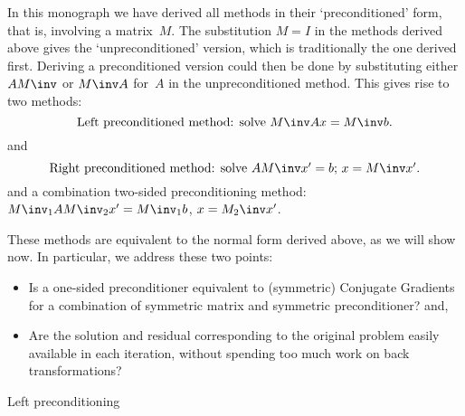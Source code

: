 \documentclass[11pt]{artikel3}
\begin{document}
\begin{Outline}
In this monograph we have derived all methods in their
`preconditioned' form, that is, involving a matrix~$M$.
The substitution $M=I$ in the methods derived above gives the 
`unpreconditioned' version, which is traditionally the one derived
first. Deriving a preconditioned version could then be done
by substituting either $AM\inv$ or $M\inv A$ for~$A$ in the unpreconditioned
method. This gives rise to two methods:
\begin{equation}
 \hbox{Left preconditioned method: solve $M\inv Ax=M\inv b$.}\end{equation}
and 
\begin{equation}
 \hbox{Right preconditioned method: solve $AM\inv x'=b$; $x=M\inv x'$.}\end{equation}
and a combination two-sided preconditioning method:
$M\inv_1AM\inv_2x'=M\inv_1b$, $x=M_2\inv x'$.

These methods are equivalent to the normal form derived above,
as we will show now. In particular, we address these two points:
\begin{itemize}
\item Is a one-sided preconditioner equivalent to (symmetric) Conjugate
Gradients for a combination of symmetric matrix and symmetric preconditioner?
and,
\item Are the solution and residual corresponding to the original
problem easily available in each iteration, without spending
too much work on back transformations?
\end{itemize}

 {Left preconditioning}


\end{Outline}
\end{document}
